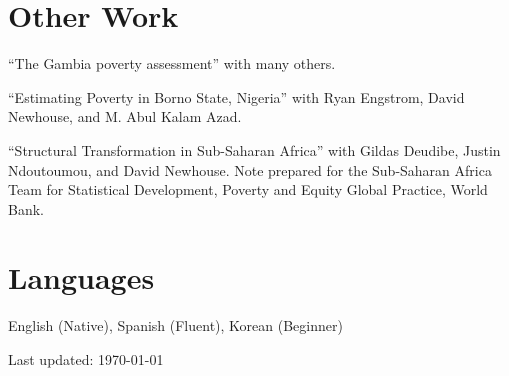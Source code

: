 \documentclass{article}
\renewenvironment{itemize}{
  \begin{list}{}{
    \setlength{\leftmargin}{0em}
  }
}{
  \end{list}
}
\begin{document}
{\section*{Other Work}
\vspace{-4mm}
\hrulefill
\begin{itemize}
	\item ``The Gambia poverty assessment'' with many others.
	\item ``Estimating Poverty in Borno State, Nigeria'' with Ryan Engstrom, David Newhouse, and M. Abul Kalam Azad.
	\item ``Structural Transformation in Sub-Saharan Africa'' with Gildas Deudibe, Justin Ndoutoumou, and David Newhouse. Note prepared for the Sub-Saharan Africa Team for Statistical Development, Poverty and Equity Global Practice, World Bank.
\end{itemize}


\vspace{0.5mm}

\section*{Languages}
\vspace{-4mm}
\hrulefill
\begin{itemize}
	\item English (Native), Spanish (Fluent), Korean (Beginner)
\end{itemize}

\vspace{0.5mm}


\vfill

\begin{center}
  \begin{footnotesize}
    Last updated: \today \\
  \end{footnotesize}
\end{center}
\end{document}
